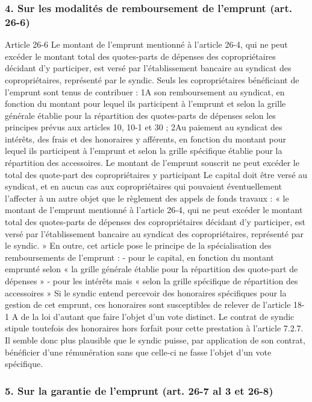 		\subsubsection{4. Sur les modalités de remboursement de l'emprunt (art. 26-6)}
		
			Article 26-6
			Le montant de l'emprunt mentionné à l'article 26-4, qui ne peut excéder le montant total des quotes-parts de dépenses des copropriétaires décidant d'y participer, est versé par l'établissement bancaire au syndicat des copropriétaires, représenté par le syndic. Seuls les copropriétaires bénéficiant de l'emprunt sont tenus de contribuer : 1\degres A son remboursement au syndicat, en fonction du montant pour lequel ils participent à l'emprunt et selon la grille générale établie pour la répartition des quotes-parts de dépenses selon les principes prévus aux articles 10, 10-1 et 30 ; 2\degres Au paiement au syndicat des intérêts, des frais et des honoraires y afférents, en fonction du montant pour lequel ils participent à l'emprunt et selon la grille spécifique établie pour la répartition des accessoires.
			Le montant de l’emprunt souscrit ne peut excéder le total des quote-part des copropriétaires y participant
			Le capital doit être versé au syndicat, et en aucun cas aux copropriétaires qui pouvaient éventuellement l'affecter à un autre objet que le règlement des appels de fonds travaux : « le montant de l’emprunt mentionné à l’article 26-4, qui ne peut excéder le montant total des quotes-parts de dépenses des copropriétaires décidant d’y participer, est versé par l’établissement bancaire au syndicat des copropriétaires, représenté par le syndic. »
			En outre, cet article pose le principe de la spécialisation des remboursements de l'emprunt :
			- pour le capital, en fonction du montant emprunté selon « la grille générale établie pour la répartition des quote-part de dépenses »
			- pour les intérêts mais « selon la grille spécifique de répartition des accessoires »
			Si le syndic entend percevoir des honoraires spécifiques pour la gestion de cet emprunt, ces honoraires sont susceptibles de relever de l'article 18-1 A de la loi d'autant que faire l'objet d'un vote distinct. Le contrat de syndic stipule toutefois des honoraires hors forfait pour cette prestation à l’article 7.2.7. Il semble donc plus plausible que le syndic puisse, par application de son contrat, bénéficier d’une rémunération sans que celle-ci ne fasse l’objet d’un vote spécifique.
		
		\subsubsection{5. Sur la garantie de l’emprunt (art. 26-7 al 3 et 26-8)}
		
